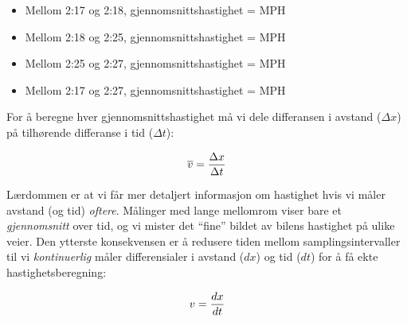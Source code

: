 





\begin{itemize}
\item{} Mellom 2:17 og 2:18, gjennomsnittshastighet =  MPH
\vskip 5pt
\item{} Mellom 2:18 og 2:25, gjennomsnittshastighet =  MPH
\vskip 5pt
\item{} Mellom 2:25 og 2:27, gjennomsnittshastighet =  MPH
\vskip 10pt
\item{} Mellom 2:17 og 2:27, gjennomsnittshastighet =  MPH
\end{itemize}







For å beregne hver gjennomsnittshastighet må vi dele differansen i avstand ($\Delta x$) på tilhørende differanse i tid ($\Delta t$):

$$\overline{v} = {\Delta x \over \Delta t}$$

\vskip 10pt

Lærdommen er at vi får mer detaljert informasjon om hastighet hvis vi måler avstand (og tid) {\it oftere}. Målinger med lange mellomrom viser bare et {\it gjennomsnitt} over tid, og vi mister det ``fine'' bildet av bilens hastighet på ulike veier. Den ytterste konsekvensen er å redusere tiden mellom samplingsintervaller til vi {\it kontinuerlig} måler differensialer i avstand ($dx$) og tid ($dt$) for å få ekte hastighetsberegning:

$$v = {dx \over dt}$$



